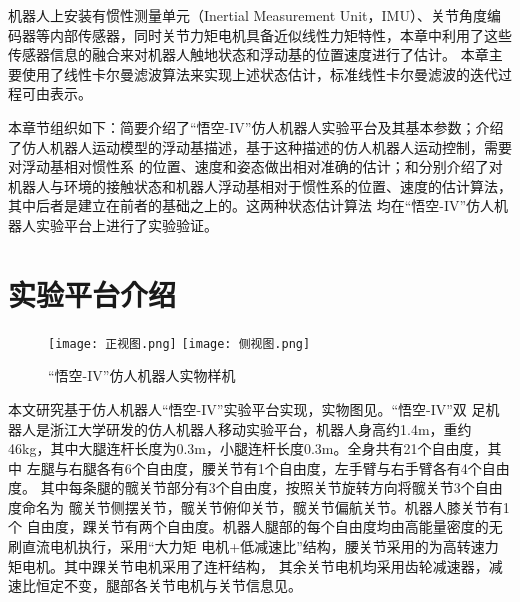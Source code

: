 机器人上安装有惯性测量单元（Inertial Measurement Unit，IMU）、关节角度编码器等内部传感器，同时关节力矩电机具备近似线性力矩特性，本章中利用了这些传感器信息的融合来对机器人触地状态和浮动基的位置速度进行了估计。
本章主要使用了线性卡尔曼滤波算法来实现上述状态估计，标准线性卡尔曼滤波的迭代过程可由表示。

本章节组织如下：简要介绍了“悟空-IV”仿人机器人实验平台及其基本参数；介绍了仿人机器人运动模型的浮动基描述，基于这种描述的仿人机器人运动控制，需要对浮动基相对惯性系
的位置、速度和姿态做出相对准确的估计；和分别介绍了对机器人与环境的接触状态和机器人浮动基相对于惯性系的位置、速度的估计算法，其中后者是建立在前者的基础之上的。这两种状态估计算法
均在“悟空-IV”仿人机器人实验平台上进行了实验验证。
\section{实验平台介绍}
\label{sec:exp_platform}
\begin{figure}[htbp]
    \centering
        {%
            \texttt{[image: 正视图.png]}}
        {%
            \texttt{[image: 侧视图.png]}}
    \caption{“悟空-IV”仿人机器人实物样机\label{fig:wukong_pic}}
\end{figure}
本文研究基于仿人机器人“悟空-IV”实验平台实现，实物图见。“悟空-IV”双
足机器人是浙江大学研发的仿人机器人移动实验平台，机器人身高约1.4m，重约
46kg，其中大腿连杆长度为0.3m，小腿连杆长度0.3m。全身共有21个自由度，其中
左腿与右腿各有6个自由度，腰关节有1个自由度，左手臂与右手臂各有4个自由度。
其中每条腿的髋关节部分有3个自由度，按照关节旋转方向将髋关节3个自由度命名为
髋关节侧摆关节，髋关节俯仰关节，髋关节偏航关节。机器人膝关节有1个
自由度，踝关节有两个自由度。机器人腿部的每个自由度均由高能量密度的无刷直流电机执行，采用“大力矩
电机+低减速比”结构，腰关节采用的为高转速力矩电机。其中踝关节电机采用了连杆结构，
其余关节电机均采用齿轮减速器，减速比恒定不变，腿部各关节电机与关节信息见。
